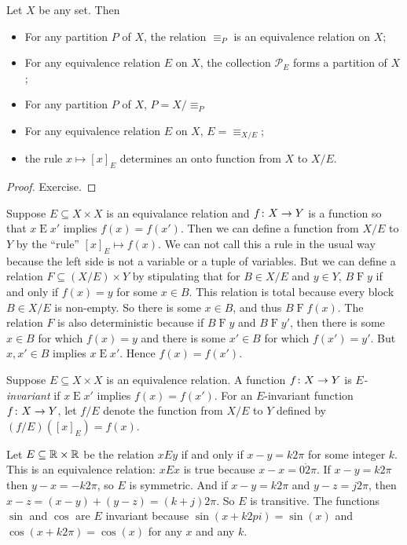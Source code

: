 \begin{lemma}
	Let $X$ be any set. Then
	\begin{itemize}
		\item For any partition $P$ of $X$, the relation $\equiv_P$ is an equivalence relation on $X$;
		\item For any equivalence relation $E$ on $X$, the collection ${\mathcal P}_E$ forms a partition of $X$;
		\item For any partition $P$ of $X$, $P = X/{\equiv_P}$
		\item For any equivalence relation $E$ on $X$, $E = \equiv_{X/E}$;
		\item the rule $x\mapsto [x]_E$ determines an onto function from $X$ to $X/E$.
	\end{itemize} 

	\begin{proof}
		Exercise.
	\end{proof} 
\end{lemma}

Suppose $E\subseteq X\times X$ is an equivalance relation and ${f}\colon{X}\to{Y}$ 
is a function so that $x\mathrel{E}x'$ implies $f(x)=f(x')$. 
Then we can define a function from $X/E$ to $Y$ by the ``rule'' $[x]_E \mapsto f(x)$.
We can not call this a rule in the usual way because the left side is not a variable or a tuple of variables. 
But we can define a relation $F\subseteq (X/E)\times Y$ by stipulating that for $B\in X/E$ and $y\in Y$, $B\mathrel{F}y$ if and only if $f(x)=y$ for some $x\in B$. 
This relation is total because every block $B\in X/E$ is non-empty. 
So there is some $x\in B$, and thus $B\mathrel{F}f(x)$.
The relation $F$ is also deterministic because if $B\mathrel{F}y$ and $B\mathrel{F}y'$, then there is some $x\in B$ for which $f(x)=y$ and there is some $x'\in B$ for which $f(x')=y'$. 
But $x,x'\in B$ implies $x\mathrel{E}x'$.
Hence $f(x)=f(x')$.

\begin{defn}
	Suppose $E\subseteq X\times X$ is an equivalence relation. 
	A function ${f}\colon{X}\to{Y}$ is \emph{$E$-invariant} if $x\mathrel{E}x'$ implies $f(x)=f(x')$.
	For an $E$-invariant function ${f}\colon{X}\to{Y}$, let $f/E$ denote the function 
	from $X/E$ to $Y$ defined by $(f/E)([x]_E) = f(x)$.
\end{defn}

\begin{example}
	Let $E\subseteq \mathbb R\times \mathbb R$ be the relation $xEy$ if and only if $x-y = k2\pi$ for some integer $k$. This is an equivalence relation:
	$xEx$ is true because $x-x=0\dot2\pi$. If $x-y=k2\pi$ then $y-x=-k2\pi$, so
	 $E$ is symmetric. And if $x-y=k2\pi$ and $y-z=j2\pi$, then $x-z = (x-y)+(y-z) = (k+j)2\pi$. So $E$ is transitive. The functions $\sin$ and $\cos$ are $E$ invariant because $\sin(x + k2pi) = \sin(x)$ and $\cos(x + k2\pi) = \cos(x)$ for any $x$ and any $k$. 
\end{example}

